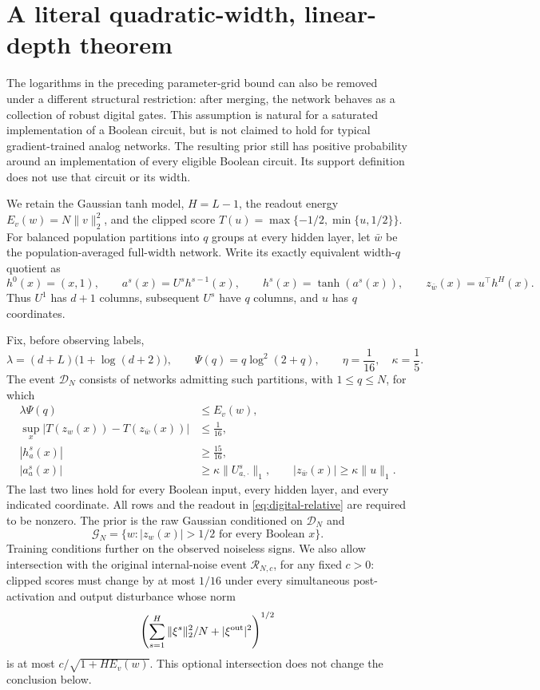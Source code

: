 \section{A literal quadratic-width, linear-depth theorem}
\label{sec:digital}

The logarithms in the preceding parameter-grid bound can also be removed
under a different structural restriction: after merging, the network behaves as a
collection of robust digital gates.  This assumption is natural for a
saturated implementation of a Boolean circuit, but is not claimed to hold
for typical gradient-trained analog networks.  The resulting prior still
has positive probability around an implementation of every eligible
Boolean circuit.  Its support definition does not use that circuit or its
width.

We retain the Gaussian tanh model, $H=L-1$, the readout energy
$E_v(w)=N\|v\|_2^2$, and the clipped score
$T(u)=\max\{-1/2,\min\{u,1/2\}\}$.
For balanced population partitions into $q$ groups at every hidden layer,
let $\bar w$ be the population-averaged full-width network.  Write its
exactly equivalent width-$q$ quotient as
\[
 h^0(x)=(x,1),\qquad a^s(x)=U^sh^{s-1}(x),\qquad
 h^s(x)=\tanh(a^s(x)),\qquad z_{\bar w}(x)=u^\top h^H(x).
\]
Thus $U^1$ has $d+1$ columns, subsequent $U^s$ have $q$ columns,
and $u$ has $q$ coordinates.

Fix, before observing labels,
\begin{equation}\label{eq:digital-calibration}
 \lambda=(d+L)\bigl(1+\log(d+2)\bigr),\qquad
 \Psi(q)=q\log^2(2+q),\qquad
 \eta=\frac1{16},\quad \kappa=\frac15.
\end{equation}
The event $\mathcal D_N$ consists of networks admitting such partitions,
with $1\le q\le N$, for which
\begin{align}
 \lambda\Psi(q)&\le E_v(w),\label{eq:digital-count}\\
 \sup_x|T(z_w(x))-T(z_{\bar w}(x))|&\le\frac1{16},
                    \label{eq:digital-merge}\\
 |h^s_a(x)|&\ge\frac{15}{16},
                    \label{eq:digital-saturation}\\
 |a^s_a(x)|&\ge\kappa\|U^s_{a,\cdot}\|_1,
 \qquad |z_{\bar w}(x)|\ge\kappa\|u\|_1.
                    \label{eq:digital-relative}
\end{align}
The last two lines hold for every Boolean input, every hidden layer,
and every indicated coordinate.  All rows and the readout in
\eqref{eq:digital-relative} are required to be nonzero.
The prior is the raw Gaussian conditioned on $\mathcal D_N$ and
\[
 \mathcal G_N=\{w: |z_w(x)|>1/2\text{ for every Boolean }x\}.
\]
Training conditions further on the observed noiseless signs.  We also
allow intersection with the original internal-noise event
$\mathcal R_{N,c}$, for any fixed $c>0$: clipped scores must change by at
most $1/16$ under every simultaneous post-activation and output disturbance
whose norm
\[
 \left(\sum_{s=1}^H\|\xi^s\|_2^2/N+|\xi^{\rm out}|^2\right)^{1/2}
\]
is at most $c/\sqrt{1+HE_v(w)}$.
This optional intersection does not change the conclusion below.

